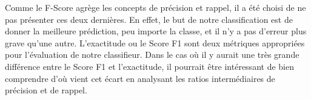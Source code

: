 Comme le F-Score agrège les concepts de précision et rappel, il a été choisi de ne pas présenter ces deux dernières. En effet, le but de notre classification est de donner la meilleure prédiction, peu importe la classe, et il n'y a pas d'erreur plus grave qu'une autre. L'exactitude ou le Score F1 sont deux métriques appropriées pour l'évaluation de notre classifieur. Dans le cas où il y aurait une très grande différence entre le Score F1 et l'exactitude, il pourrait être intéressant de bien comprendre d'où vient cet écart en analysant les ratios intermédiaires de précision et de rappel.

\begin{table}[H]
	
\caption{\label{tab:perfo_test}Performances des différents modèles sur le jeu de données de test selon les différentes mesures de performance.}
\centering
{}

\end{table}

